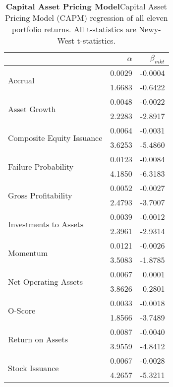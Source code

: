 
\begin{table}[htbp]
\centering
\scriptsize
\caption[Capital Asset Pricing Model]{\textbf{Capital Asset Pricing Model}\newline Capital Asset Pricing Model (CAPM) regression of all eleven portfolio returns. All t-statistics are Newy-West t-statistics.}
\label{tab:capm}
\begin{tabular}{@{}lrr@{}}
\toprule
& $\alpha$ & $\beta_{mkt}$ \\ \midrule
\multirow{2}{*}{Accrual} & 0.0029 & -0.0004 \\
& 1.6683 & -0.6422 \\
\multirow{2}{*}{Asset Growth} & 0.0048 & -0.0022 \\
& 2.2283 & -2.8917 \\
\multirow{2}{*}{Composite Equity Issuance} & 0.0064 & -0.0031 \\
& 3.6253 & -5.4860 \\
\multirow{2}{*}{Failure Probability} & 0.0123 & -0.0084 \\
& 4.1850 & -6.3183 \\
\multirow{2}{*}{Gross Profitability} & 0.0052 & -0.0027 \\
& 2.4793 & -3.7007 \\
\multirow{2}{*}{Investments to Assets} & 0.0039 & -0.0012 \\
& 2.3961 & -2.9314 \\
\multirow{2}{*}{Momentum} & 0.0121 & -0.0026 \\
& 3.5083 & -1.8785 \\
\multirow{2}{*}{Net Operating Assets} & 0.0067 & 0.0001 \\
& 3.8626 & 0.2801 \\
\multirow{2}{*}{O-Score} & 0.0033 & -0.0018 \\
& 1.8566 & -3.7489 \\
\multirow{2}{*}{Return on Assets} & 0.0087 & -0.0040 \\
& 3.9559 & -4.8412 \\
\multirow{2}{*}{Stock Issuance} & 0.0067 & -0.0028 \\
& 4.2657 & -5.3211 \\ \bottomrule
\end{tabular}
\end{table}

